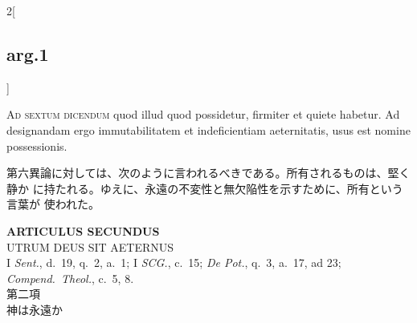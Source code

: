 \documentclass[paper=a4paper,fontsize=10pt,jafontsize=9pt,titlepage]{jlreq}
\begin{document}
\begin{paracol}{2}[\subsection{arg.1}]
\switchcolumn*[\subsection{ad.6}]

{\scshape Ad sextum dicendum} quod illud quod possidetur, firmiter et
quiete habetur. Ad designandam ergo immutabilitatem et indeficientiam
aeternitatis, usus est nomine possessionis.

\switchcolumn

第六異論に対しては、次のように言われるべきである。所有されるものは、堅く静か
に持たれる。ゆえに、永遠の不変性と無欠陥性を示すために、所有という言葉が
使われた。

\end{paracol}


\newpage
{}

\begin{center}
 {\Large {\bfseries ARTICULUS SECUNDUS}}\\
 {\large UTRUM DEUS SIT AETERNUS}\\
 {\footnotesize I {\itshape Sent.}, d.~19, q.~2, a.~1; I {\itshape
 SCG.}, c.~15; {\itshape De Pot.}, q.~3, a.~17, ad 23; {\itshape
 Compend.~Theol.}, c.~5, 8.}\\
 {\Large 第二項\\神は永遠か}
\end{center}


{}
\setcounter{section}{2}
\setcounter{subsection}{0}
\end{document}
